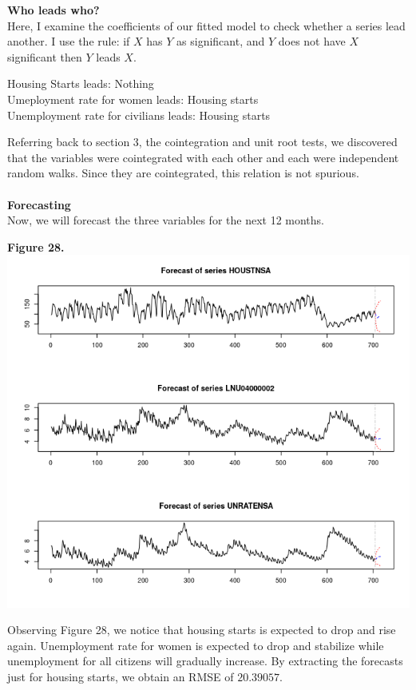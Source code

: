 \documentclass[11pt]{article}
\begin{document}
\textbf{Who leads who?}
\\
Here, I examine the coefficients of our fitted model to check whether a series lead another. I use the rule: if $X$ has $Y$ as significant, and $Y$ does not have $X$ significant then $Y$ leads $X$.
\begin{center}
Housing Starts leads: Nothing\\
Umeployment rate for women leads: Housing starts\\
Unemployment rate for civilians leads: Housing starts
\end{center}
Referring back to section 3, the cointegration and unit root tests, we discovered that the variables were cointegrated with each other and each were independent random walks. Since they are cointegrated, this relation is not spurious.
\\\\
\textbf{Forecasting}
\\
Now, we will forecast the three variables for the next 12 months.
\begin{center}
\textbf{Figure 28.}
\\
\includegraphics[scale=1]{varFor}
\end{center}
Observing Figure 28, we notice that housing starts is expected to drop and rise again. Unemployment rate for women is expected to drop and stabilize while unemployment for all citizens will gradually increase. By extracting the forecasts just for housing starts, we obtain an RMSE of $20.39057$.
\end{document}
